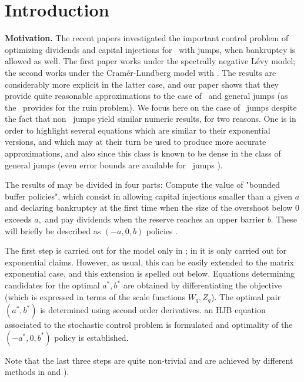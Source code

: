 \section{Introduction %
\label{s:low}}

{\bf Motivation.} The recent papers \cite{Gaj,AGLW}
 investigated  the important control problem  of  optimizing dividends
 and  capital injections for \procs\ with jumps, when bankruptcy is allowed as well. The first paper works under the  spectrally negative L\'evy model; the second works under the  Cramér-Lundberg model  with \expoj.  The results are considerably more explicit in the latter case, and our paper shows that   they provide quite reasonable  approximations to the  case of \me\ and general jumps (as the \deV\ provides for the ruin problem).  We focus here on the case of \me\ jumps despite the fact that non \me\ jumps yield similar numeric results, for two reasons. One is in order to highlight  several equations which are similar to their exponential  versions,  and
 which may  at their turn be used to produce more accurate approximations, and also since this class is known to be dense in the class of general \nne jumps (even error bounds are available for \cm\ jumps \cite{vatamidou2014accuracy}).

 The results of \cite{Gaj,AGLW} may be divided in four parts:
 \BEN \im Compute the value of "bounded buffer policies", which
consist in allowing capital injections smaller than a given $a$ and declaring bankruptcy at the first time when the size of the overshoot below 0 exceeds $a,$ and  pay dividends when the reserve reaches an upper barrier $b$. These will briefly be described as $(-a,0,b)$ policies \fno.

The first  step is  carried out for the \snL model  only in \cite{Gaj}; in \cite{AGLW} it is only carried out for exponential claims.  However, as usual, this can be easily extended to the matrix exponential case, and this extension is spelled out below.
\im Equations determining candidates for the optimal
$a^*,b^*$ are  obtained
 by differentiating  the objective (which is expressed in terms of the scale functions
$W_q,Z_q$).
 \im The   optimal pair
    $(a^*,b^*)$ is determined  using second order derivatives.
    \im an  HJB equation associated to the stochastic control problem is formulated and optimality of the $(-a^*,0,b^*)$ policy is established.
 \EEN

Note that the last three steps are   quite non-trivial and are achieved by different methods in \cite{Gaj} and \cite{AGLW}).

